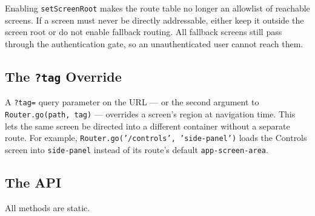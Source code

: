 \begin{warnbox}
Enabling \texttt{setScreenRoot} makes the route table no longer an allowlist of reachable screens.  If a screen must never be directly addressable, either keep it outside the screen root or do not enable fallback routing.  All fallback screens still pass through the authentication gate, so an unauthenticated user cannot reach them.
\end{warnbox}

\subsection{The \texttt{?tag} Override}
\label{sec:rs-router-tagoverride}

A \texttt{?tag=} query parameter on the URL --- or the second argument to \texttt{Router.go(path, tag)} --- overrides a screen's region at navigation time.  This lets the same screen be directed into a different container without a separate route.  For example, \texttt{Router.go('/controls', 'side-panel')} loads the Controls screen into \texttt{side-panel} instead of its route's default \texttt{app-screen-area}.

\subsection{The API}
\label{sec:rs-router-api}

All methods are static.

